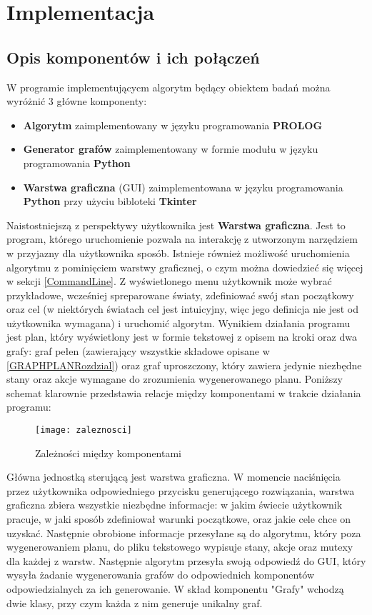 \chapter{Implementacja}
\thispagestyle{chapterBeginStyle}

\section{Opis komponentów i ich połączeń}
    W programie implementującycm algorytm będący obiektem badań można wyróżnić 3 główne komponenty:
    \begin{itemize}
        \item \textbf{Algorytm} zaimplementowany w języku programowania \textbf{PROLOG}
        \item \textbf{Generator grafów} zaimplementowany w formie modułu w języku programowania \textbf{Python}
        \item \textbf{Warstwa graficzna} (GUI) zaimplementowana w języku programowania \textbf{Python} przy użyciu bibloteki \textbf{Tkinter}
    \end{itemize}
    Naistostniejszą z perspektywy użytkownika jest \textbf{Warstwa graficzna}. Jest to program, którego uruchomienie pozwala na 
    interakcję z utworzonym narzędziem w przyjazny dla użytkownika sposób. Istnieje również możliwość uruchomienia algorytmu z pominięciem 
    warstwy graficznej, o czym można dowiedzieć się więcej w sekcji \ref{CommandLine}.
    Z wyświetlonego menu użytkownik może wybrać przykładowe, wcześniej spreparowane światy, zdefiniować swój stan początkowy oraz cel (w niektórych 
    światach cel jest intuicyjny, więc jego definicja nie jest od użytkownika wymagana) i uruchomić algorytm. Wynikiem działania programu jest 
    plan, który wyświetlony jest w formie tekstowej z opisem na kroki oraz dwa grafy: graf pełen (zawierający wszystkie składowe opisane 
    w \ref{GRAPHPLANRozdzial}) oraz graf uproszczony, który zawiera jedynie niezbędne stany oraz akcje wymagane do zrozumienia wygenerowanego planu.
    Poniższy schemat klarownie przedstawia relacje między komponentami w trakcie działania programu:
    \begin{figure}[H]
        \texttt{[image: zaleznosci]}
        \centering
        \caption{Zależności między komponentami}
    \end{figure}
    Główna jednostką sterującą jest warstwa graficzna. W momencie naciśnięcia przez użytkownika odpowiedniego przycisku generującego rozwiązania, warstwa 
    graficzna zbiera wszystkie niezbędne informacje: w jakim świecie użytkownik pracuje, w jaki sposób zdefiniował warunki początkowe, oraz jakie cele 
    chce on uzyskać. Następnie obrobione informacje przesyłane są do algorytmu, który poza wygenerowaniem planu, do pliku tekstowego wypisuje 
    stany, akcje oraz mutexy dla każdej z warstw. Następnie algorytm przesyła swoją odpowiedź do GUI, 
    który wysyła żadanie wygenerowania grafów do odpowiednich komponentów odpowiedzialnych za ich 
    generowanie. W skład komponentu "Grafy" wchodzą dwie klasy, przy czym każda z nim generuje unikalny graf.

